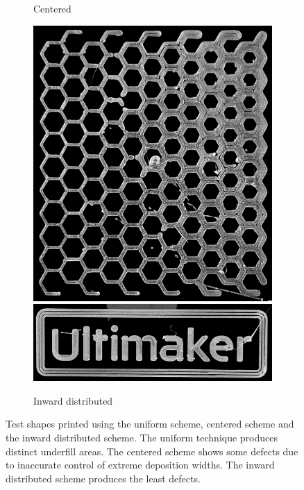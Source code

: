 \begin{figure}
\begin{subfigure}{\figwidth}
\caption{Centered}\label{print_center}
\end{subfigure}
\begin{subfigure}{\figwidth}\centering
\includegraphics[height=\figheight]{sources-applications-P3-print-hex-inward-edited.png}
\includegraphics[width=\figwidth]{sources-applications-P3-print-UM-inward-edited.png}
\caption{Inward distributed}\label{print_inward}
\end{subfigure}
\caption{
Test shapes printed using the uniform scheme, centered scheme and the inward distributed scheme.
The uniform technique produces distinct underfill areas.
The centered scheme shows some defects due to inaccurate control of extreme deposition widths.
The inward distributed scheme produces the least defects.
}
\label{prints}
\end{figure}


